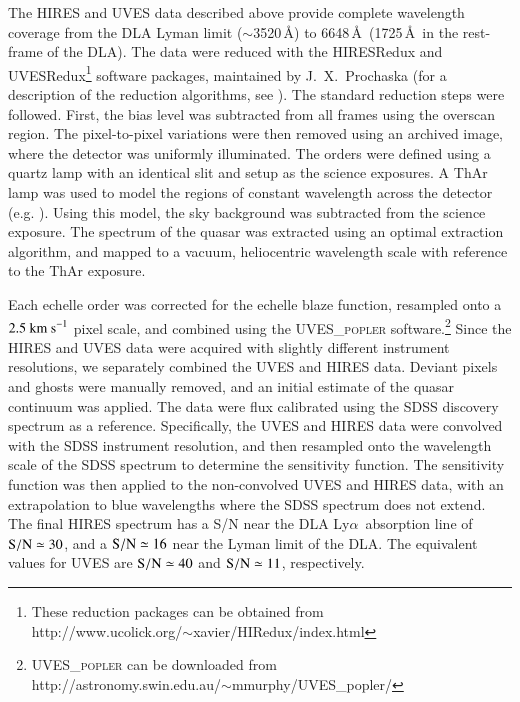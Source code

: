 \documentclass[12pt,preprint,useAMS,usenatbib]{emulateapj}
\newcommand{\Lya}{Ly$\alpha$}
\begin{document}
The HIRES and UVES data described above provide complete
wavelength coverage from the DLA Lyman limit ($\sim$3520\,\AA) to
6648\,\AA\ (1725\,\AA\ in the rest-frame of the DLA). The data were
reduced with the HIRESRedux and UVESRedux\footnote{These
reduction packages can be obtained from\\
http://www.ucolick.org/$\sim$xavier/HIRedux/index.html}
software packages, maintained by J.~X.~Prochaska
(for a description of the reduction algorithms, see \citealt{BerBurPro15}).
The standard reduction steps were followed. First, the bias level
was subtracted from all frames using the overscan region. The
pixel-to-pixel variations were then removed using an archived
image, where the detector was uniformly illuminated. The orders
were defined using a quartz lamp with an identical slit and setup
as the science exposures. A ThAr lamp was used to model the
regions of constant wavelength across the detector (e.g. \citealt{Kel03}).
Using this model, the sky background was subtracted from the science
exposure. The spectrum of the quasar was extracted using an
optimal extraction algorithm, and mapped to a vacuum, heliocentric
wavelength scale with reference to the ThAr exposure.

Each echelle order was corrected for the echelle blaze
function, resampled onto a $2.5~{\rm km~s}^{-1}$
pixel scale, and combined using the UVES\_\textsc{popler}
software.\footnote{UVES\_\textsc{popler} can be downloaded from\\
http://astronomy.swin.edu.au/$\sim$mmurphy/UVES\_popler/}
Since the HIRES and UVES data were acquired with slightly
different instrument resolutions, we separately combined the
UVES and HIRES data. Deviant pixels and ghosts were
manually removed, and an initial estimate of the quasar
continuum was applied. The data were flux calibrated using
the SDSS discovery spectrum as a reference. Specifically,
the UVES and HIRES data were convolved with the SDSS
instrument resolution, and then resampled onto the wavelength
scale of the SDSS spectrum to determine the sensitivity
function. The sensitivity function was then applied to the
non-convolved UVES and HIRES data, with an extrapolation
to blue wavelengths where the SDSS spectrum does not
extend. The final HIRES spectrum has a S/N near the DLA
\Lya\ absorption line of ${\rm S/N}\simeq30$, and a ${\rm S/N}\simeq16$ near
the Lyman limit of the DLA. The equivalent values for UVES
are ${\rm S/N}\simeq40$ and ${\rm S/N}\simeq11$, respectively.


\end{document}
